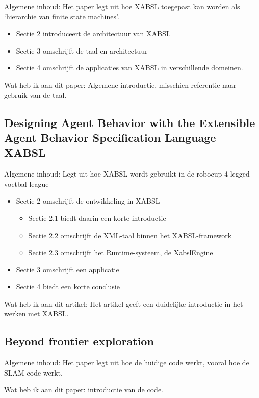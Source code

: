\documentclass[a4paper,10pt]{article}
\begin{document}
Algemene inhoud: Het paper legt uit hoe XABSL toegepast kan worden als
`hierarchie van finite state machines'.
\begin{itemize}
\item Sectie 2 introduceert de architectuur van XABSL
\item Sectie 3 omschrijft de taal en architectuur
\item Sectie 4 omschrijft de applicaties van XABSL in verschillende domeinen.
\end{itemize}

Wat heb ik aan dit paper: Algemene introductie, misschien referentie naar
gebruik van de taal.

\subsection*{Designing Agent Behavior with the Extensible Agent Behavior
Specification
Language XABSL\cite{lotzsch2004designing}}

Algemene inhoud:
Legt uit hoe XABSL wordt gebruikt in de robocup 4-legged voetbal league

\begin{itemize}
\item Sectie 2 omschrijft de ontwikkeling in XABSL
\begin{itemize}
    \item Sectie 2.1 biedt daarin een korte introductie
    \item Sectie 2.2 omschrijft de XML-taal binnen het XABSL-framework
    \item Sectie 2.3 omschrijft het Runtime-systeem, de XabslEngine
\end{itemize}
\item Sectie 3 omschrijft een applicatie
\item Sectie 4 biedt een korte conclusie
\end{itemize}

Wat heb ik aan dit artikel: Het artikel geeft een duidelijke introductie in het
werken met XABSL.


\subsection*{Beyond frontier exploration\cite{visser2008beyond}}

Algemene inhoud: Het paper legt uit hoe de huidige code werkt, vooral hoe de
SLAM code werkt.

Wat heb ik aan dit paper: introductie van de code.    
\end{document}
